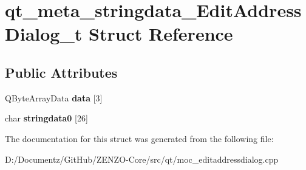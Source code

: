\hypertarget{structqt__meta__stringdata___edit_address_dialog__t}{}\section{qt\+\_\+meta\+\_\+stringdata\+\_\+\+Edit\+Address\+Dialog\+\_\+t Struct Reference}
\label{structqt__meta__stringdata___edit_address_dialog__t}
\subsection*{Public Attributes}
\begin{DoxyCompactItemize}
\item 
\mbox{\label{structqt__meta__stringdata___edit_address_dialog__t_a9bf375fc7d80d491cc6635d1e03945c6}} 
Q\+Byte\+Array\+Data {\bfseries data} \mbox{[}3\mbox{]}
\item 
\mbox{\label{structqt__meta__stringdata___edit_address_dialog__t_ad25ab7e7bf5bcc3837dce6c724918ddc}} 
char {\bfseries stringdata0} \mbox{[}26\mbox{]}
\end{DoxyCompactItemize}


The documentation for this struct was generated from the following file\+:\begin{DoxyCompactItemize}
\item 
D\+:/\+Documentz/\+Git\+Hub/\+Z\+E\+N\+Z\+O-\/\+Core/src/qt/moc\+\_\+editaddressdialog.\+cpp\end{DoxyCompactItemize}

